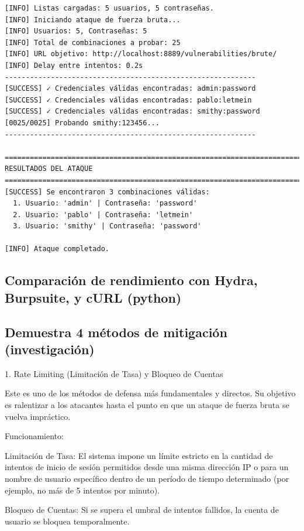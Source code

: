 \documentclass[letter,12pt]{article}
\begin{document}
\begin{verbatim}
[INFO] Listas cargadas: 5 usuarios, 5 contraseñas.
[INFO] Iniciando ataque de fuerza bruta...
[INFO] Usuarios: 5, Contraseñas: 5
[INFO] Total de combinaciones a probar: 25
[INFO] URL objetivo: http://localhost:8889/vulnerabilities/brute/
[INFO] Delay entre intentos: 0.2s
------------------------------------------------------------
[SUCCESS] ✓ Credenciales válidas encontradas: admin:password                    
[SUCCESS] ✓ Credenciales válidas encontradas: pablo:letmein                     
[SUCCESS] ✓ Credenciales válidas encontradas: smithy:password                   
[0025/0025] Probando smithy:123456...                      
------------------------------------------------------------

================================================================================
RESULTADOS DEL ATAQUE
================================================================================
[SUCCESS] Se encontraron 3 combinaciones válidas:
  1. Usuario: 'admin' | Contraseña: 'password'
  2. Usuario: 'pablo' | Contraseña: 'letmein'
  3. Usuario: 'smithy' | Contraseña: 'password'

[INFO] Ataque completado.
\end{verbatim}

\subsection{Comparación de rendimiento con Hydra, Burpsuite, y cURL (python)}

\newpage
\subsection{Demuestra 4 métodos de mitigación (investigación)}


1. Rate Limiting (Limitación de Tasa) y Bloqueo de Cuentas

Este es uno de los métodos de defensa más fundamentales y directos. Su objetivo es ralentizar a los atacantes hasta el punto en que un ataque de fuerza bruta se vuelva impráctico.

    Funcionamiento:

        Limitación de Tasa: El sistema impone un límite estricto en la cantidad de intentos de inicio de sesión permitidos desde una misma dirección IP o para un nombre de usuario específico dentro de un período de tiempo determinado (por ejemplo, no más de 5 intentos por minuto).

        Bloqueo de Cuentas: Si se supera el umbral de intentos fallidos, la cuenta de usuario se bloquea temporalmente.
\end{document}
